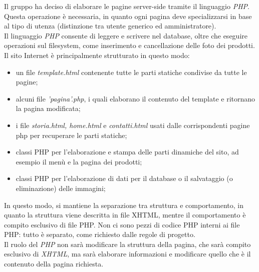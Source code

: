 Il gruppo ha deciso di elaborare le pagine server-side tramite il linguaggio \emph{PHP}. Questa operazione è necessaria, in quanto ogni 
pagina deve specializzarsi in base al tipo di utenza (distinzione tra utente generico ed amministratore).\\
Il linguaggio \emph{PHP} consente di leggere e scrivere nel database, oltre che eseguire operazioni sul filesystem, come inserimento e 
cancellazione delle foto dei prodotti.\\
Il sito Internet è principalmente strutturato in questo modo: 
\begin{itemize}
    \item un file \emph{template.html} contenente tutte le parti statiche condivise da tutte le pagine;
    \item alcuni file \emph{'pagina'.php}, i quali elaborano il contenuto del template e ritornano la pagina modificata;
    \item i file \emph{storia.html, home.html} e \emph{contatti.html} usati dalle corrispondenti pagine php per recuperare le parti statiche;
    \item classi PHP per l'elaborazione e stampa delle parti dinamiche del sito, ad esempio il menù e la pagina dei prodotti;
    \item classi PHP per l'elaborazione di dati per il database o il salvataggio (o eliminazione) delle immagini;
\end{itemize}
In questo modo, si mantiene la separazione tra struttura e comportamento, in quanto la struttura viene descritta in file XHTML, mentre il comportamento
è compito esclusivo di file PHP. Non ci sono pezzi di codice PHP interni ai file PHP: tutto è separato, come richiesto dalle regole di progetto.\\
Il ruolo del \emph{PHP} non sarà modificare la struttura della pagina, che sarà compito esclusivo di \emph{XHTML}, ma sarà elaborare 
informazioni e modificare quello che è il contenuto della pagina richiesta.\\

